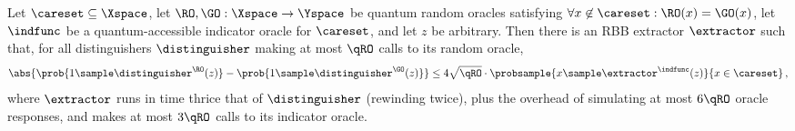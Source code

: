     \begin{lemma}
      Let $\careset \subseteq \Xspace$, let $\RO, \GO: \Xspace \to \Yspace$
      be quantum random oracles satisfying $\forall x \not\in \careset: \RO(x) =
      \GO(x)$, let $\indfunc$ be a quantum-accessible indicator oracle for
      $\careset$, and let $z$ be arbitrary. Then 
      there is an RBB extractor $\extractor$ such that, for all distinguishers
      $\distinguisher$ making at most $\qRO$ calls to its random oracle, 
      \[
        \abs{
          \prob{1 \sample \distinguisher^{\RO}(z)} - \prob{1 \sample \distinguisher^{\GO}(z)}
        } \leq 4 \sqrt{\qRO} \cdot \probsample{x \sample \extractor^{\indfunc}(z)}{x \in \careset}\, ,
      \]
      where $\extractor$ runs in time thrice that of $\distinguisher$ (rewinding
      twice), plus the overhead of simulating at most $6\qRO$ oracle responses,
      and makes at most $3\qRO$ calls to its indicator oracle.
    \end{lemma}


